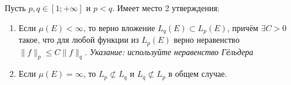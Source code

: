 \begin{exercise}
	Пусть $p, q \in [1; +\infty]$ и $p < q$. Имеет место 2 утверждения:
	\begin{enumerate}
		\item Если $\mu(E) < \infty$, то верно вложение $L_q(E) \subset L_p(E)$, причём $\exists C > 0$ такое, что для любой функции из $L_p(E)$ верно неравенство $\|f\|_p \le C\|f\|_q$. \textit{Указание: используйте неравенство Гёльдера}
		
		\item Если $\mu(E) = \infty$, то $L_p \not\subset L_q$ и $L_q \not\subset L_p$ в общем случае.
	\end{enumerate}
\end{exercise}